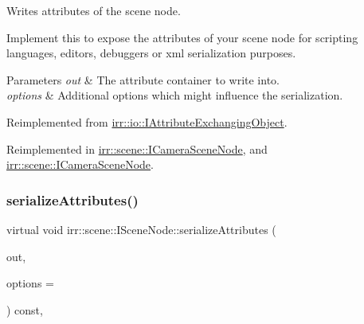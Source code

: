 Writes attributes of the scene node. 

Implement this to expose the attributes of your scene node for scripting languages, editors, debuggers or xml serialization purposes. 
\begin{DoxyParams}{Parameters}
{\em out} & The attribute container to write into. \\
\hline
{\em options} & Additional options which might influence the serialization. \\
\hline
\end{DoxyParams}


Reimplemented from \hyperlink{classirr_1_1io_1_1IAttributeExchangingObject_a587f7b633366968f0488e1099e9172ef}{irr\+::io\+::\+I\+Attribute\+Exchanging\+Object}.



Reimplemented in \hyperlink{classirr_1_1scene_1_1ICameraSceneNode_a0a78a29638be1665ee5dba22c2c3b846}{irr\+::scene\+::\+I\+Camera\+Scene\+Node}, and \hyperlink{classirr_1_1scene_1_1ICameraSceneNode_a0a78a29638be1665ee5dba22c2c3b846}{irr\+::scene\+::\+I\+Camera\+Scene\+Node}.

\mbox{\label{classirr_1_1scene_1_1ISceneNode_a3210345b70227c03c7f889c94754fdaa}} 
\subsubsection{\texorpdfstring{serialize\+Attributes()}{serializeAttributes()}\hspace{0.1cm}{\footnotesize\ttfamily [2/2]}}
{\footnotesize\ttfamily virtual void irr\+::scene\+::\+I\+Scene\+Node\+::serialize\+Attributes (\begin{DoxyParamCaption}\item[{\hyperlink{classirr_1_1io_1_1IAttributes}{io\+::\+I\+Attributes} $\ast$}]{out,  }\item[{\hyperlink{structirr_1_1io_1_1SAttributeReadWriteOptions}{io\+::\+S\+Attribute\+Read\+Write\+Options} $\ast$}]{options = {} }\end{DoxyParamCaption}) const\hspace{0.3cm}{\ttfamily [inline]}, {\ttfamily [virtual]}}



